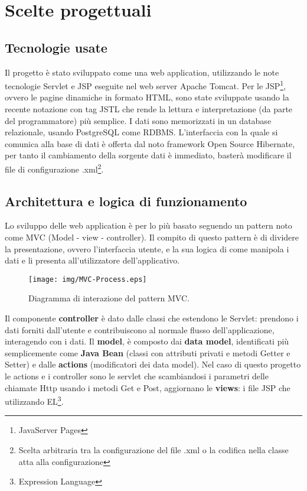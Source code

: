 \def\baselinestretch{1}
\chapter{Scelte progettuali} \label{cap1}
\def\baselinestretch{1.66}
\section{Tecnologie usate}
Il progetto \`e stato sviluppato come una web application, utilizzando le note tecnologie Servlet e JSP
eseguite nel web server Apache Tomcat. Per le JSP\footnote{JavaServer Pages},
ovvero le pagine dinamiche in formato HTML, sono state sviluppate usando la recente notazione con tag JSTL che rende 
la lettura e interpretazione (da parte del programmatore) pi\`u semplice. 
I dati sono memorizzati in un database relazionale, usando PostgreSQL come RDBMS. L'interfaccia con la
quale si comunica alla base di dati \`e offerta dal noto framework Open Source
Hibernate, per tanto il cambiamento della sorgente dati \`e immediato,
baster\`a modificare il file di configurazione .xml\footnote{Scelta arbitraria tra la configurazione del
file .xml o la codifica nella classe atta alla configurazione}.
\newpage
\section{Architettura e logica di funzionamento}
Lo sviluppo delle web application \`e per lo pi\`u basato seguendo un pattern noto come MVC (Model - view - controller). Il compito di questo pattern \`e di dividere la presentazione,
ovvero l'interfaccia utente, e la sua logica di come manipola i dati e li presenta all'utilizzatore dell'applicativo.
\begin{figure}[ht]
    \centering
    \texttt{[image: img/MVC-Process.eps]}
    \caption{Diagramma di interazione del pattern MVC.}
\end{figure}

Il componente \textbf{controller} \`e dato dalle classi che estendono le Servlet: prendono i dati forniti dall'utente
e contribuiscono al normale flusso dell'applicazione, interagendo con i dati.
Il \textbf{model}, \`e composto dai \textbf{data model}, identificati pi\`u semplicemente come \textbf{Java Bean} (classi con attributi privati e metodi Getter e Setter) e dalle \textbf{actions} (modificatori dei data model).
Nel caso di questo progetto le actions e i controller sono le servlet che scambiandosi i parametri delle chiamate Http usando i metodi Get e Post, aggiornano le \textbf{views}: i file JSP che utilizzando EL\footnote{Expression Language}.
